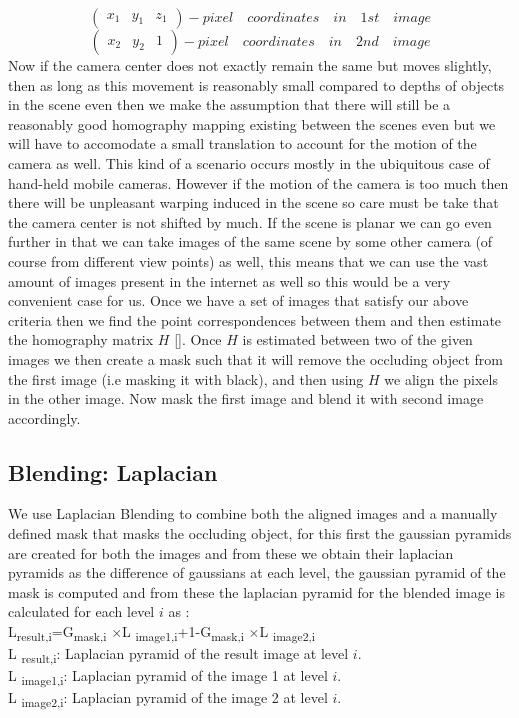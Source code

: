 \documentclass[conference]{IEEEtran}
\begin{document}
\[\begin{pmatrix} x_1 & y_1 & z_1 \end{pmatrix} -pixel\quad coordinates\quad in\quad 1st\quad image\] 
\[\begin{pmatrix} x_2 & y_2 & 1 \end{pmatrix} -pixel\quad coordinates\quad in\quad 2nd\quad image\] 
	Now if the camera center does not exactly remain the same but moves slightly, then as long as this movement is reasonably small compared to depths of objects in the scene even then we make the assumption that there will still be a reasonably good homography mapping existing between the scenes even but we will have to accomodate a small translation to account for the motion of the camera as well. This kind of a scenario occurs mostly in the ubiquitous case of hand-held mobile cameras. However if the motion of the camera is too much then there will be unpleasant warping induced in the scene so care must be take that the camera center is not shifted by much. If the scene is planar we can go even further in that we can take images of the same scene by some other camera (of course from different view points) as well, this means that we can use the vast amount of images present in the internet as well so this would be a very convenient case for us. Once we have a set of images that satisfy our above criteria then we find the point correspondences between them and then estimate the homography matrix $H$ [\cite{hartley2003multiple}]. Once $H$ is estimated between two of the given images we then create a mask such that it will remove the occluding object from the first image (i.e masking it with black), and then using $H$ we align the pixels in the other image. Now mask the first image and blend it with second image accordingly.     
\subsection{Blending: Laplacian}
	We use Laplacian Blending to combine both the aligned images and a manually defined mask that masks the occluding object, for this first the gaussian pyramids are created for both the images and from these we obtain their laplacian pyramids as the difference of gaussians at each level, the gaussian pyramid of the mask is computed and from these the laplacian pyramid for the blended image is calculated for each level $ i$ as :\\
	L\textsubscript{result,i}=G\textsubscript{mask,i} $\times$L \textsubscript{image1,i}+1-G\textsubscript{mask,i} $\times$L \textsubscript{image2,i}
\\	L \textsubscript{result,i}: Laplacian pyramid of the result image at level $i$.
\\	L \textsubscript{image1,i}: Laplacian pyramid of the image 1 at level $i$.
\\ 	L \textsubscript{image2,i}: Laplacian pyramid of the image 2 at level $i$.
\end{document}
